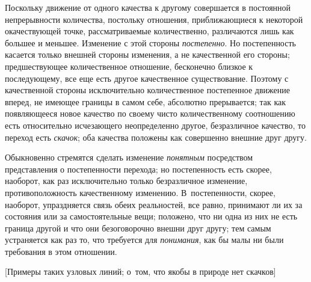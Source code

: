 Поскольку движение от одного качества к другому совершается в постоянной
непрерывности количества, постольку отношения, приближающиеся к некоторой
окачествующей точке, рассматриваемые количественно, различаются лишь как
большее и меньшее. Изменение с этой стороны
{\em постепенно}. Но постепенность касается только
внешней стороны изменения, а не качественной его стороны; предшествующее
количественное отношение, бесконечно близкое к последующему, все еще есть
другое качественное существование. Поэтому с качественной стороны
исключительно количественное постепенное движение вперед, не имеющее
границы в самом себе, абсолютно прерывается; так как появляющееся новое
качество по своему чисто количественному соотношению есть относительно
исчезающего неопределенно другое, безразличное качество, то переход есть
{\em скачок}; оба качества положены как совершенно внешние друг другу.

Обыкновенно стремятся сделать изменение {\em понятным}
посредством представления о постепенности перехода; но постепенность есть
скорее, наоборот, как раз исключительно только безразличное изменение,
противоположность качественному изменению. В~постепенности, скорее,
наоборот, упраздняется связь обеих реальностей, все равно, принимают ли их
за состояния или за самостоятельные вещи; положено, что ни одна из них не
есть граница другой и что они безоговорочно внешни друг другу; тем самым
устраняется как раз то, что требуется для
{\em понимания}, как бы малы ни были требования в этом отношении.

%
  {[Примеры таких узловых линий; о~том, что якобы в природе нет скачков]}

